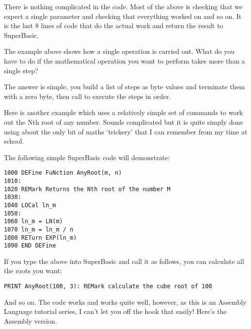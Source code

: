 There is nothing complicated in the code. Most of the above is
    checking that we expect a single parameter and checking that everything
    worked on and so on. It is the last 8 lines of code that do the actual
    work and return the result to SuperBasic.

The example above shows how a single operation is carried out. What
    do you have to do if the mathematical operation you want to perform takes
    more than a single step?

The answer is simple, you build a list of steps as byte values and
    terminate them with a zero byte, then call  to execute the steps
    in order.

Here is another example which uses a relatively simple set of
    commands to work out the Nth root of any number. Sounds complicated but it
    is quite simply done using about the only bit of maths `trickery' that I
    can remember from my time at school.

The following simple SuperBasic code will demonstrate:

\begin{lstlisting}[firstnumber=1,language={}]
1000 DEFine FuNction AnyRoot(m, n)
1010:
1020 REMark Returns the Nth root of the number M
1030:
1040 LOCal ln_m
1050:
1060 ln_m = LN(m)
1070 ln_m = ln_m / n
1080 RETurn EXP(ln_m)
1090 END DEFine
\end{lstlisting}

If you type the above into SuperBasic and call it as follows, you
    can calculate all the roots you want:

\begin{lstlisting}[firstnumber=1,language={}]
PRINT AnyRoot(100, 3): REMark calculate the cube root of 100
\end{lstlisting}

And so on. The code works and works quite well, however, as this is
    an Assembly Language tutorial series, I can't let you off the hook that
    easily! Here's the Assembly version.

